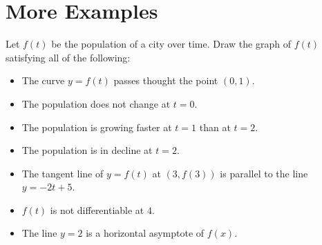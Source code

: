 \documentclass[../main.tex]{subfiles}
\begin{document}
\section{More Examples}
\begin{example}
  Let \(f(t)\) be the population of a city over time. Draw the graph of \(f(t)\) satisfying all of the following:
  \begin{itemize}
    \item The curve \(y = f(t)\) passes thought the point \((0,1)\).
    \item The population does not change at \(t = 0\).
    \item The population is growing faster at \(t = 1\) than at \(t = 2\).
    \item The population is in decline at \(t = 2\).
    \item The tangent line of \(y=f(t)\) at \((3,f(3))\) is parallel to the line \(y = -2t + 5\).
    \item \(f(t)\) is not differentiable at \(4\).
    \item The line \(y = 2\) is a horizontal asymptote of \(f(x)\).
  \end{itemize}

\end{example}

\clearpage

%
\end{document}
